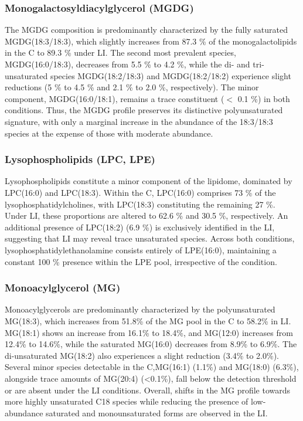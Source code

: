 \documentclass[10pt,letterpaper]{article}
\begin{document}
\begin{itemize}
\subsubsection*{Monogalactosyldiacylglycerol (MGDG)}
The MGDG composition is predominantly characterized by the fully saturated MGDG(18:3/18:3), which slightly increases from 87.3 \% of the monogalactolipids in the C to 89.3 \% under LI. The second most prevalent species, MGDG(16:0/18:3), decreases from 5.5 \% to 4.2 \%, while the di- and tri-unsaturated species MGDG(18:2/18:3) and MGDG(18:2/18:2) experience slight reductions (5 \% to 4.5 \% and 2.1 \% to 2.0 \%, respectively). The minor component, MGDG(16:0/18:1), remains a trace constituent ($<$ 0.1 \%) in both conditions. Thus, the MGDG profile preserves its distinctive polyunsaturated signature, with only a marginal increase in the abundance of the 18:3/18:3 species at the expense of those with moderate abundance.

\subsubsection*{Lysophospholipids (LPC, LPE)}
Lysophospholipids constitute a minor component of the lipidome, dominated by LPC(16:0) and LPC(18:3). Within the C, LPC(16:0) comprises 73 \% of the lysophosphatidylcholines, with LPC(18:3) constituting the remaining 27 \%. Under LI, these proportions are altered to 62.6 \% and 30.5 \%, respectively. An additional presence of LPC(18:2) (6.9 \%) is exclusively identified in the LI, suggesting that LI may reveal trace unsaturated species. Across both conditions, lysophosphatidylethanolamine consists entirely of LPE(16:0), maintaining a constant 100 \% presence within the LPE pool, irrespective of the condition.

\subsubsection*{Monoacylglycerol (MG)} 
Monoacylglycerols are predominantly characterized by the polyunsaturated MG(18:3), which increases from 51.8\% of the MG pool in the C to 58.2\% in LI. MG(18:1) shows an increase from 16.1\% to 18.4\%, and MG(12:0) increases from 12.4\% to 14.6\%, while the saturated MG(16:0) decreases from 8.9\% to 6.9\%. The di-unsaturated MG(18:2) also experiences a slight reduction (3.4\% to 2.0\%). Several minor species detectable in the C,MG(16:1) (1.1\%) and MG(18:0) (6.3\%), alongside trace amounts of MG(20:4) (\textless0.1\%), fall below the detection threshold or are absent under the LI conditions. Overall, shifts in the MG profile towards more highly unsaturated C18 species while reducing the presence of low-abundance saturated and monounsaturated forms are observed in the LI.


\end{itemize}
\end{document}
